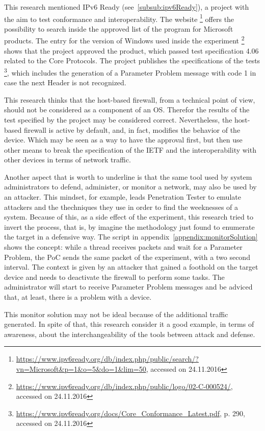 \documentclass[12pt]{article}
\begin{document}
This research mentioned IPv6 Ready (see~\ref{subsub:ipv6Ready}), a project with the aim to test conformance and interoperability. The website \footnote{\url{https://www.ipv6ready.org/db/index.php/public/search/?vn=Microsoft&p=1&o=5&do=1&lim=50}, accessed on 24.11.2016} offers the possibility to search inside the approved list of the program for Microsoft products. The entry for the version of Windows used inside the experiment \footnote{\url{https://www.ipv6ready.org/db/index.php/public/logo/02-C-000524/}, accessed on 24.11.2016} shows that the project approved the product, which passed test specification 4.06 related to the Core Protocols. The project publishes the specifications of the tests \footnote{\url{https://www.ipv6ready.org/docs/Core_Conformance_Latest.pdf}, p. 290, accessed on 24.11.2016}, which includes the generation of a Parameter Problem message with code 1 in case the next Header is not recognized.

This research thinks that the host-based firewall, from a technical point of view, should not be considered as a component of an OS. Therefor the results of the test specified by the project may be considered correct. Nevertheless, the host-based firewall is active by default, and, in fact, modifies the behavior of the device. Which may be seen as a way to have the approval first, but then use other means to break the specification of the IETF and the interoperability with other devices in terms of network traffic.

Another aspect that is worth to underline is that the same tool used by system administrators to defend, administer, or monitor a network, may also be used by an attacker. This mindset, for example, leads Penetration Tester to emulate attackers and the thechniques they use in order to find the weeknesses of a system. Because of this, as a side effect of the experiment, this research tried to invert the process, that is, by imagine the methodology just found to enumerate the target in a defensive way. The script in appendix~\ref{appendix:monitorSolution} shows the concept: while a thread receives packets and wait for a Parameter Problem,  the PoC sends the same packet of the experiment, with a two second interval. The context is given by an attacker that gained a foothold on the target device and needs to deactivate the firewall to perform some tasks. The administrator will start to receive Parameter Problem messages and be adviced that, at least, there is a problem with a device.

This monitor solution may not be ideal because of the additional traffic generated. In spite of that, this research consider it a good example, in terms of awareness, about the interchangeability of the tools between attack and defense.
\end{document}

